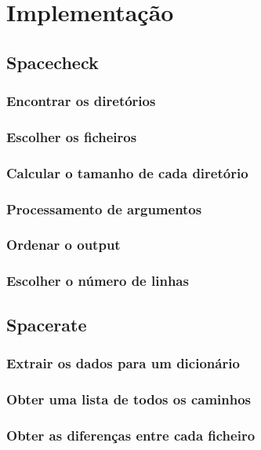 \chapter{Implementação}

\section{Spacecheck}

\subsection{Encontrar os diretórios}

\subsection{Escolher os ficheiros}

\subsection{Calcular o tamanho de cada diretório}

\subsection{Processamento de argumentos}

\subsection{Ordenar o output}

\subsection{Escolher o número de linhas}

\section{Spacerate}

\subsection{Extrair os dados para um dicionário}

\subsection{Obter uma lista de todos os caminhos}

\subsection{Obter as diferenças entre cada ficheiro}

